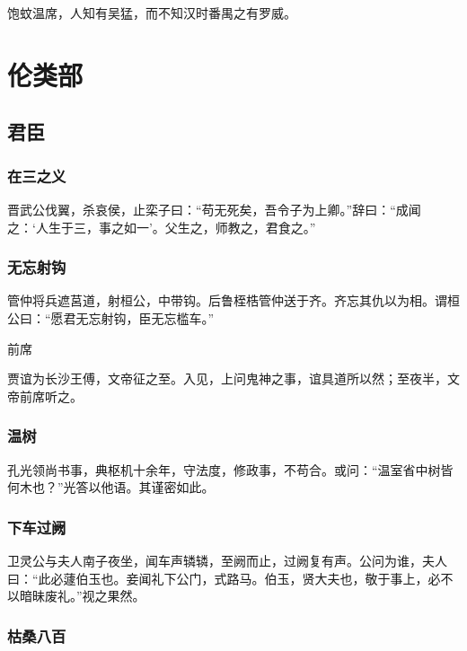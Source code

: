 \documentclass[a4paper,12pt,UTF8,twoside]{ctexbook}
\begin{document}
    饱蚊温席，人知有吴猛，而不知汉时番禺之有罗威。
    
    
    
    \part{伦类部}
    
    \chapter{君臣}
    
    \section{在三之义}
    
    晋武公伐翼，杀哀侯，止栾子曰：“苟无死矣，吾令子为上卿。”辞曰：“成闻之：‘人生于三，事之如一’。父生之，师教之，君食之。”
    
    \section{无忘射钩}
    
    管仲将兵遮莒道，射桓公，中带钩。后鲁桎梏管仲送于齐。齐忘其仇以为相。谓桓公曰：“愿君无忘射钩，臣无忘槛车。”
    
    前席
    
    贾谊为长沙王傅，文帝征之至。入见，上问鬼神之事，谊具道所以然；至夜半，文帝前席听之。
    
    \section{温树}
    
    孔光领尚书事，典枢机十余年，守法度，修政事，不苟合。或问：“温室省中树皆何木也？”光答以他语。其谨密如此。
    
    \section{下车过阙}
    
    卫灵公与夫人南子夜坐，闻车声辚辚，至阙而止，过阙复有声。公问为谁，夫人曰：“此必蘧伯玉也。妾闻礼下公门，式路马。伯玉，贤大夫也，敬于事上，必不以暗昧废礼。”视之果然。
    
    \section{枯桑八百}
    
\end{document}
